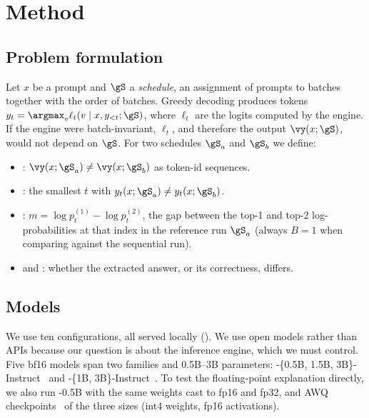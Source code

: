 \section{Method}
\label{sec:method}

\subsection{Problem formulation}
Let $x$ be a prompt and $\gS$ a \emph{schedule}, \ie an assignment of prompts to batches together with the order of batches. Greedy decoding produces tokens $y_t = \argmax_v \ell_t(v \mid x, y_{<t}; \gS)$, where $\ell_t$ are the logits computed by the engine. If the engine were batch-invariant, $\ell_t$, and therefore the output $\vy(x;\gS)$, would not depend on $\gS$. For two schedules $\gS_a$ and $\gS_b$ we define:
\begin{itemize}[leftmargin=*,itemsep=0pt,topsep=0pt]
    \item {}: $\vy(x;\gS_a) \neq \vy(x;\gS_b)$ as token-id sequences.
    \item {}: the smallest $t$ with $y_t(x;\gS_a) \neq y_t(x;\gS_b)$.
    \item {}: $m = \log p^{(1)}_t - \log p^{(2)}_t$, the gap between the top-1 and top-2 log-probabilities at that index in the reference run $\gS_a$ (always $B=1$ when comparing against the sequential run).
    \item {} and : whether the extracted answer, or its correctness, differs.
\end{itemize}

\subsection{Models}
We use ten configurations, all served locally (). We use open models rather than APIs because our question is about the inference engine, which we must control. Five bf16 models span two families and 0.5B--3B parameters: \qwen-\{0.5B, 1.5B, 3B\}-Instruct~\citep{qwen2024qwen25} and \llama-\{1B, 3B\}-Instruct~\citep{meta2024llama32}. To test the floating-point explanation directly, we also run \qwen-0.5B with the same weights cast to fp16 and fp32, and AWQ checkpoints~\citep{lin2024awq} of the three \qwen sizes (int4 weights, fp16 activations).

